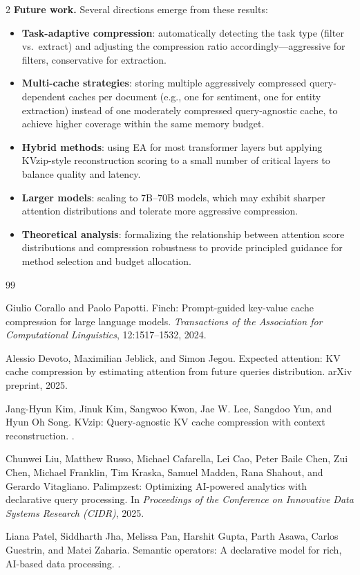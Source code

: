 \documentclass[10pt,a4paper]{article}
\begin{document}
\begin{multicols}{2}
\textbf{Future work.} Several directions emerge from these results:
\begin{itemize}
  \item \textbf{Task-adaptive compression}: automatically detecting the
    task type (filter vs.\ extract) and adjusting the compression ratio
    accordingly---aggressive for filters, conservative for extraction.
  \item \textbf{Multi-cache strategies}: storing multiple aggressively
    compressed query-dependent caches per document (e.g., one for
    sentiment, one for entity extraction) instead of one moderately
    compressed query-agnostic cache, to achieve higher coverage within
    the same memory budget.
  \item \textbf{Hybrid methods}: using EA for most transformer layers
    but applying KVzip-style reconstruction scoring to a small number
    of critical layers to balance quality and latency.
  \item \textbf{Larger models}: scaling to 7B--70B models, which may
    exhibit sharper attention distributions and tolerate more aggressive
    compression.
  \item \textbf{Theoretical analysis}: formalizing the relationship
    between attention score distributions and compression robustness to
    provide principled guidance for method selection and budget
    allocation.
\end{itemize}

\begin{thebibliography}{99}

Giulio Corallo and Paolo Papotti.
\newblock Finch: Prompt-guided key-value cache compression for large language
models.
\newblock \emph{Transactions of the Association for Computational Linguistics},
12:1517--1532, 2024.

Alessio Devoto, Maximilian Jeblick, and Simon Jegou.
\newblock Expected attention: KV cache compression by estimating attention from
future queries distribution.
\newblock arXiv preprint, 2025.

Jang-Hyun Kim, Jinuk Kim, Sangwoo Kwon, Jae W. Lee, Sangdoo Yun, and Hyun Oh
Song.
\newblock KVzip: Query-agnostic KV cache compression with context
reconstruction.
.

Chunwei Liu, Matthew Russo, Michael Cafarella, Lei Cao, Peter Baile Chen, Zui
Chen, Michael Franklin, Tim Kraska, Samuel Madden, Rana Shahout, and Gerardo
Vitagliano.
\newblock Palimpzest: Optimizing AI-powered analytics with declarative query
processing.
\newblock In \emph{Proceedings of the Conference on Innovative Data Systems
Research (CIDR)}, 2025.

Liana Patel, Siddharth Jha, Melissa Pan, Harshit Gupta, Parth Asawa, Carlos
Guestrin, and Matei Zaharia.
\newblock Semantic operators: A declarative model for rich, AI-based data
processing.
.

\end{thebibliography}

\end{multicols}
\end{document}
